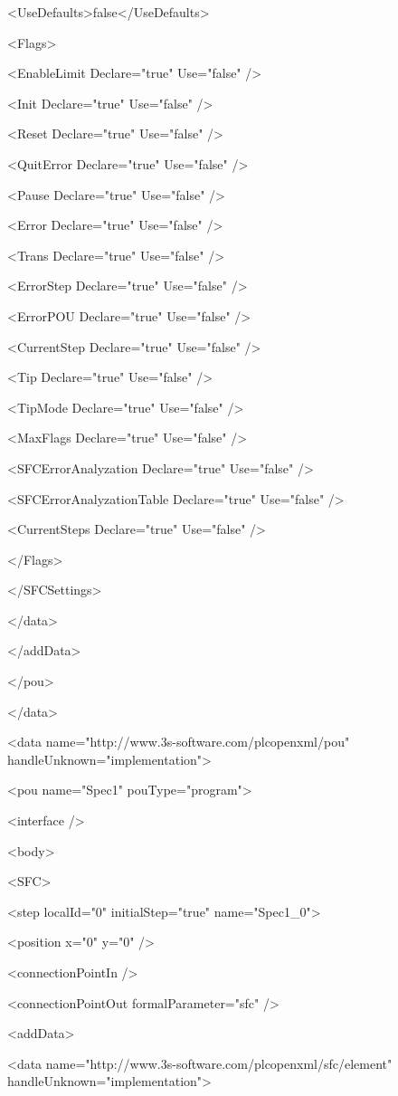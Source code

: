 {  <UseDefaults>false</UseDefaults>

  <Flags>

   <EnableLimit Declare="true" Use="false" />

   <Init Declare="true" Use="false" />

   <Reset Declare="true" Use="false" />

   <QuitError Declare="true" Use="false" />

   <Pause Declare="true" Use="false" />

   <Error Declare="true" Use="false" />

   <Trans Declare="true" Use="false" />

   <ErrorStep Declare="true" Use="false" />

   <ErrorPOU Declare="true" Use="false" />

   <CurrentStep Declare="true" Use="false" />

   <Tip Declare="true" Use="false" />

   <TipMode Declare="true" Use="false" />

   <MaxFlags Declare="true" Use="false" />

   <SFCErrorAnalyzation Declare="true" Use="false" />

   <SFCErrorAnalyzationTable Declare="true" Use="false" />

   <CurrentSteps Declare="true" Use="false" />

  </Flags>

 </SFCSettings>

</data>

</addData>

</pou>

</data>

<data name="http://www.3s-software.com/plcopenxml/pou" handleUnknown="implementation">

<pou name="Spec1" pouType="program">

<interface />

<body>

<SFC>

 <step localId="0" initialStep="true" name="Spec1\_0">

  <position x="0" y="0" />

  <connectionPointIn />

  <connectionPointOut formalParameter="sfc" />

  <addData>

   <data name="http://www.3s-software.com/plcopenxml/sfc/element" handleUnknown="implementation">

}
